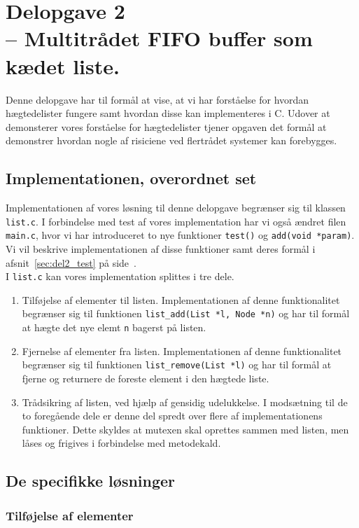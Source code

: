 \documentclass[main.tex]{subfile}
\begin{document}
\section{Delopgave 2\\\normalsize{-- Multitrådet FIFO buffer som kædet liste.}}
Denne delopgave har til formål at vise, at vi har forståelse for hvordan hægtedelister fungere samt hvordan disse kan implementeres i C. Udover at demonsterer vores forståelse for hægtedelister tjener opgaven det formål at demonstrer hvordan nogle af risiciene ved flertrådet systemer kan forebygges.

\subsection{Implementationen, overordnet set}
Implementationen af vores løsning til denne delopgave begrænser sig til klassen \texttt{list.c}. I forbindelse med test af vores implementation har vi også ændret filen \texttt{main.c}, hvor vi har introduceret to nye funktioner \texttt{test()} og \texttt{add(void *param)}. Vi vil beskrive implementationen af disse funktioner samt deres formål i afsnit~\ref{sec:del2_test} på side~\pageref{sec:del2_test}.\\

I \texttt{list.c} kan vores implementation splittes i tre dele.
\begin{enumerate}
\item Tilføjelse af elementer til listen. Implementationen af denne funktionalitet begrænser sig til funktionen \texttt{list\_add(List *l, Node *n)} og har til formål at hægte det nye elemt \texttt{n} bagerst på listen.
\item Fjernelse af elementer fra listen. Implementationen af denne funktionalitet begrænser sig til funktionen \texttt{list\_remove(List *l)} og har til formål at fjerne og returnere de foreste element i den hægtede liste.
\item Trådsikring af listen, ved hjælp af gensidig udelukkelse. I modsætning til de to foregående dele er denne del spredt over flere af implementationens funktioner. Dette skyldes at mutexen skal oprettes sammen med listen, men låses og frigives i forbindelse med metodekald.  
\end{enumerate}

\subsection{De specifikke løsninger}
\subsubsection{Tilføjelse af elementer}
\end{document}
